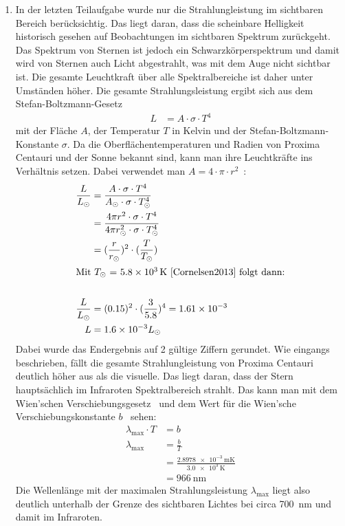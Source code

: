 \begin{enumerate}
	\item In der letzten Teilaufgabe wurde nur die Strahlungleistung im sichtbaren Bereich berücksichtig. Das liegt daran, dass die scheinbare Helligkeit historisch gesehen auf Beobachtungen im sichtbaren Spektrum zurückgeht. Das Spektrum von Sternen ist jedoch ein Schwarzkörperspektrum und damit wird von Sternen auch Licht abgestrahlt, was mit dem Auge nicht sichtbar ist. Die gesamte Leuchtkraft über alle Spektralbereiche ist daher unter Umständen höher. Die gesamte Strahlungsleistung ergibt sich aus dem Stefan-Boltzmann-Gesetz~\cite[S.16]{Cornelsen2013}
	\begin{align*}
		L&=A\cdot\sigma\cdot T^4
	\end{align*}
	mit der Fläche $A$, der Temperatur $T$ in Kelvin und der Stefan-Boltzmann-Konstante $\sigma$. Da die Oberflächentemperaturen und Radien von Proxima Centauri und der Sonne bekannt sind, kann man ihre Leuchtkräfte ins Verhältnis setzen. Dabei verwendet man $A=4\cdot\pi\cdot r^2$~\cite[S.69]{Cornelsen2013}:
	\begin{align*}
		\frac{L}{L_\odot}&=\frac{A\cdot \sigma \cdot T^4}{A_\odot \cdot \sigma \cdot T_\odot^4}\\
		&=\frac{4\pi r^2\cdot \sigma \cdot T^4}{4\pi r_\odot^2\cdot \sigma \cdot T_\odot^4}\\
		&=\qty(\frac{r}{r_\odot})^2\cdot \qty(\frac{T}{T_\odot})\\
		\intertext{Mit $T_\odot$ = \SI{5.8e3}{\kelvin}~\cite[S.47]{Cornelsen2013} folgt dann:}\\
		\frac{L}{L_\odot}&=(\num{0.15})^2\cdot\qty(\frac{\num{3}}{\num{5.8}})^4=\num{1.61e-3}\\
		L&=\num{1.6e-3}L_\odot
	\end{align*}
	Dabei wurde das Endergebnis auf 2 gültige Ziffern gerundet. Wie eingangs beschrieben, fällt die gesamte Strahlungleistung von Proxima Centauri deutlich höher aus als die visuelle. Das liegt daran, dass der Stern hauptsächlich im Infraroten Spektralbereich strahlt. Das kann man mit dem Wien'schen Verschiebungsgesetz~\cite[S.16]{Cornelsen2013} und dem Wert für die Wien'sche Verschiebungskonstante $b$~\cite[S.42]{Cornelsen2013} sehen:
	\begin{align*}
		\lambda_{\text{max}}\cdot T&=b\\
		\lambda_{\text{max}}&=\frac{b}{T}\\
		&=\frac{\SI{2.8978e-3}{\meter \kelvin}}{\SI{3.0e3}{\kelvin}}\\
		&=\SI{966}{\nano \meter}
	\end{align*}
	Die Wellenlänge mit der maximalen Strahlungsleistung $\lambda_{\text{max}}$ liegt also deutlich unterhalb der Grenze des sichtbaren Lichtes bei circa \SI{700}{\nano\meter} und damit im Infraroten.
\end{enumerate}

